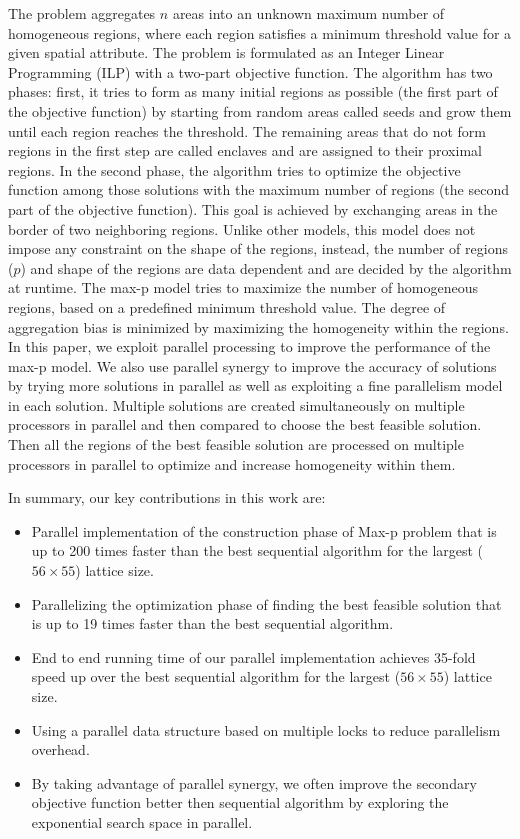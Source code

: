 \documentclass[conference]{IEEEtran}
\begin{document}
The problem aggregates $n$ areas into an unknown maximum number of homogeneous regions, where each region satisfies a minimum threshold value for a
given spatial attribute. The problem is formulated as an Integer Linear
Programming (ILP) with a two-part objective function. The algorithm has two
phases: first, it tries to form as many initial regions as possible (the first
part of the objective function) by starting from random areas called seeds and
grow them until each region reaches the threshold. The remaining areas that do
not form regions in the first step are called enclaves and are assigned to their
proximal regions. In the second phase, the algorithm tries to optimize the objective function among those solutions with the maximum number of regions (the second part of the objective function). This goal is achieved by exchanging areas in the border of two neighboring regions. Unlike other models, this model does not impose any constraint on the shape of the regions, instead, the number of regions ($p$) and shape of the regions are data dependent and are decided by the algorithm at runtime. The
max-p model tries to maximize the number of homogeneous regions, based on a predefined minimum threshold value. The degree of aggregation bias is minimized by maximizing the homogeneity within the regions. In this paper, we exploit parallel processing to improve the performance of the max-p model. We also use parallel synergy to improve the accuracy of solutions by trying more solutions in parallel as well as exploiting a fine parallelism model in each solution. Multiple solutions are created simultaneously on multiple processors in parallel and then compared to choose the best feasible solution. Then all the regions of the best feasible solution are processed on multiple processors in parallel to optimize and increase homogeneity within them.

In summary, our key contributions in this work are:
\begin{itemize}

\item Parallel implementation of the construction phase of Max-p problem that is up to 200 times faster than the best sequential algorithm for the largest ($56\times 55$) lattice size.

\item Parallelizing the optimization phase of finding the best feasible solution that is up to 19 times faster than the best sequential algorithm.

\item End to end running time of our parallel implementation achieves 35-fold speed up over the best sequential algorithm for the largest ($56\times 55$) lattice size.

\item Using a parallel data structure based on multiple locks to reduce parallelism overhead.

\item By taking advantage of parallel synergy, we often improve the secondary objective function better then sequential algorithm by exploring the exponential search space in parallel.

\end{itemize}
\end{document}
